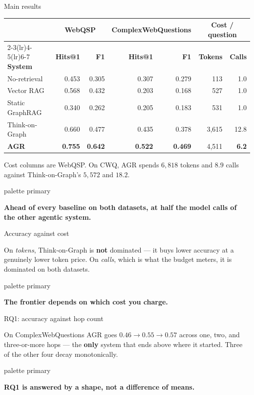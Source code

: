 \documentclass[aspectratio=169,12pt]{beamer}
\newcommand{\takeaway}[1]{%
  \vspace{1.5mm}%
  \begin{beamercolorbox}[wd=\dimexpr\textwidth-4.4mm\relax,sep=2.2mm,
    rounded=true]{palette primary}%
    \color{agrdark}\small\raggedright\textbf{#1}%
  \end{beamercolorbox}}
\begin{document}
\begin{frame}{Main results}
  \begin{table}
    \small
    \begin{tabular}{@{}lrrrrrr@{}}
      \toprule
      & \multicolumn{2}{c}{\textbf{WebQSP}}
      & \multicolumn{2}{c}{\textbf{ComplexWebQuestions}}
      & \multicolumn{2}{c}{\textbf{Cost / question}} \\
      \cmidrule(lr){2-3}\cmidrule(lr){4-5}\cmidrule(lr){6-7}
      \textbf{System} & \textbf{Hits@1} & \textbf{F1}
                      & \textbf{Hits@1} & \textbf{F1}
                      & \textbf{Tokens} & \textbf{Calls} \\
      \midrule
      No-retrieval    & 0.453 & 0.305 & 0.307 & 0.279 & 113   & 1.0 \\
      Vector RAG      & 0.568 & 0.432 & 0.203 & 0.168 & 527   & 1.0 \\
      Static GraphRAG & 0.340 & 0.262 & 0.205 & 0.183 & 531   & 1.0 \\
      Think-on-Graph  & 0.660 & 0.477 & 0.435 & 0.378 & 3{,}615 & 12.8 \\
      \textbf{AGR}    & \textbf{0.755} & \textbf{0.642}
                      & \textbf{0.522} & \textbf{0.469}
                      & 4{,}511 & \textbf{6.2} \\
      \bottomrule
    \end{tabular}
  \end{table}
  {\small Cost columns are WebQSP. On CWQ, AGR spends $6{,}818$ tokens and
  $8.9$ calls against Think-on-Graph's $5{,}572$ and $18.2$.}
  \takeaway{Ahead of every baseline on both datasets, at half the model calls
    of the other agentic system.}
\end{frame}

\begin{frame}{Accuracy against cost}
  \centering
  

  \vspace{1mm}
  {\small On \emph{tokens}, Think-on-Graph is \textbf{not} dominated --- it buys
  lower accuracy at a genuinely lower token price. On \emph{calls}, which is
  what the budget meters, it is dominated on both datasets.}
  \takeaway{The frontier depends on which cost you charge.}
\end{frame}

\begin{frame}{RQ1: accuracy against hop count}
  \centering
  

  \vspace{1mm}
  {\small On ComplexWebQuestions AGR goes $0.46 \to 0.55 \to 0.57$ across one,
  two, and three-or-more hops --- the \textbf{only} system that ends above where
  it started. Three of the other four decay monotonically.}
  \takeaway{RQ1 is answered by a shape, not a difference of means.}
\end{frame}
\end{document}
